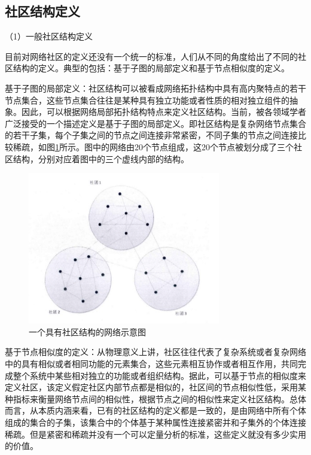 \subsection{社区结构定义}
（1）一般社区结构定义

目前对网络社区的定义还没有一个统一的标准，人们从不同的角度给出了不同的社区结构的定义。典型的包括：基于子图的局部定义和基于节点相似度的定义。

基于子图的局部定义：社区结构可以被看成网络拓扑结构中具有高内聚特点的若干节点集合，这些节点集合往往是某种具有独立功能或者性质的相对独立组件的抽象。因此，可以根据网络局部拓扑结构特点来定义社区结构。当前，被各领域学者广泛接受的一个描述定义是基于子图的局部定义。即社区结构是复杂网络节点集合的若干子集，每个子集之间的节点之间连接非常紧密，不同子集的节点之间连接比较稀疏，如图\ref{fig:fig2-1}所示。图中的网络由20个节点组成，这20个节点被划分成了三个社区结构，分别对应着图中的三个虚线内部的结构。

\begin{figure}
  \centering
  \includegraphics[width=0.75\textwidth]{figures/fig2-1}
  \caption{一个具有社区结构的网络示意图}
  \label{fig:fig2-1}
\end{figure}

 基于节点相似度的定义：从物理意义上讲，社区往往代表了复杂系统或者复杂网络中的具有相似或者相同功能的元素集合，这些元素相互协作或者相互作用，共同完成整个系统中某些相对独立的功能或者组织结构。据此，可以基于节点的相似度来定义社区，该定义假定社区内部节点都是相似的，社区间的节点相似性低，采用某种指标来衡量网络节点间的相似性，根据节点之间的相似性来定义社区结构。总体而言，从本质内涵来看，已有的社区结构的定义都是一致的，是由网络中所有个体组成的集合的子集，该集合中的个体基于某种属性连接紧密并和子集外的个体连接稀疏。但是紧密和稀疏并没有一个可以定量分析的标准，这些定义就没有多少实用的价值。

